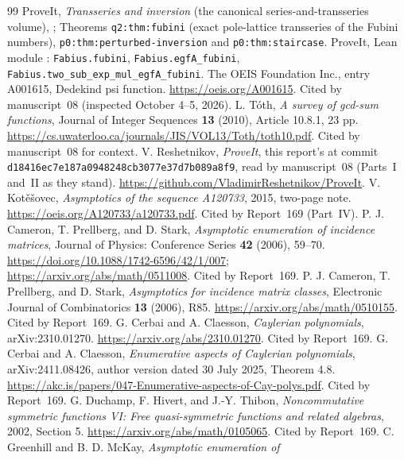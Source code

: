\documentclass[11pt]{article}
\numberwithin{equation}{section}
\theoremstyle{definition}
\theoremstyle{remark}
\begin{document}
\begin{thebibliography}{99}
 ProveIt, \emph{Transseries and inversion} (the canonical
series-and-transseries volume),
;
Theorems \texttt{q2:thm:fubini} (exact pole-lattice transseries of the
Fubini numbers), \texttt{p0:thm:perturbed-inversion} and
\texttt{p0:thm:staircase}.
 ProveIt, Lean module
:
\texttt{Fabius.fubini}, \texttt{Fabius.egfA\_fubini},
\texttt{Fabius.two\_sub\_exp\_mul\_egfA\_fubini}.
 The OEIS Foundation Inc., entry A001615, Dedekind psi
function. \url{https://oeis.org/A001615}. Cited by manuscript~08 (inspected
October 4--5, 2026).
 L. T\'oth, \emph{A survey of gcd-sum functions}, Journal of
Integer Sequences \textbf{13} (2010), Article 10.8.1, 23 pp.
\url{https://cs.uwaterloo.ca/journals/JIS/VOL13/Toth/toth10.pdf}. Cited by
manuscript~08 for context.
 V. Reshetnikov, \emph{ProveIt}, this report's
 at commit
\texttt{d18416ec7e187a0948248cb3077e37d7b089a8f9}, read by manuscript~08
(Parts~I and~II as they stand).
\url{https://github.com/VladimirReshetnikov/ProveIt}.
 V. Kot\v{e}\v{s}ovec, \emph{Asymptotics of the sequence
A120733}, 2015, two-page note. \url{https://oeis.org/A120733/a120733.pdf}.
Cited by Report~169 (Part~IV).
 P. J. Cameron, T. Prellberg, and D. Stark, \emph{Asymptotic
enumeration of incidence matrices}, Journal of Physics: Conference Series
\textbf{42} (2006), 59--70. \url{https://doi.org/10.1088/1742-6596/42/1/007};
\url{https://arxiv.org/abs/math/0511008}. Cited by Report~169.
 P. J. Cameron, T. Prellberg, and D. Stark,
\emph{Asymptotics for incidence matrix classes}, Electronic Journal of
Combinatorics \textbf{13} (2006), R85.
\url{https://arxiv.org/abs/math/0510155}. Cited by Report~169.
 G. Cerbai and A. Claesson, \emph{Caylerian polynomials},
arXiv:2310.01270. \url{https://arxiv.org/abs/2310.01270}. Cited by
Report~169.
 G. Cerbai and A. Claesson, \emph{Enumerative aspects of
Caylerian polynomials}, arXiv:2411.08426, author version dated 30 July 2025,
Theorem 4.8.
\url{https://akc.is/papers/047-Enumerative-aspects-of-Cay-polys.pdf}. Cited
by Report~169.
 G. Duchamp, F. Hivert, and J.-Y. Thibon,
\emph{Noncommutative symmetric functions VI: Free quasi-symmetric functions
and related algebras}, 2002, Section 5.
\url{https://arxiv.org/abs/math/0105065}. Cited by Report~169.
 C. Greenhill and B. D. McKay, \emph{Asymptotic enumeration of
}
\end{thebibliography}
\end{document}
